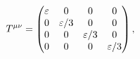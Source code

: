 {$\displaystyle
\special{dvisvgm:bbox new formula}
\special{dvisvgm:raw<!--start {?x} {?y} -->}
T^{\mu\nu}=\begin{pmatrix}
\varepsilon&0&0&0\\
0&\varepsilon/3&0&0\\
0&0&\varepsilon/3&0\\
0&0&0&\varepsilon/3
\end{pmatrix},
$
}
